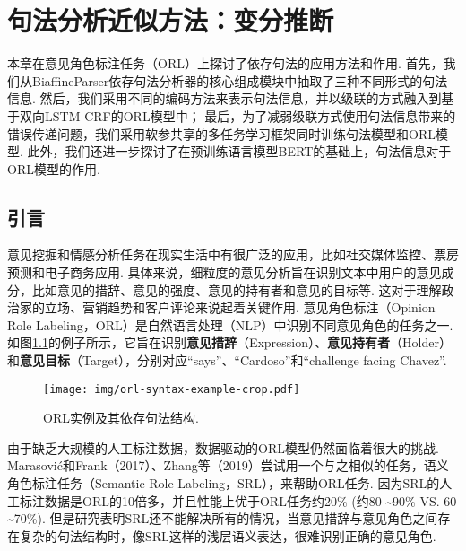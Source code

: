 \chapter{句法分析近似方法：变分推断}\label{cha:approximate-vi}
本章在意见角色标注任务（ORL）上探讨了依存句法的应用方法和作用.
首先，我们从BiaffineParser依存句法分析器的核心组成模块中抽取了三种不同形式的句法信息.
然后，我们采用不同的编码方法来表示句法信息，并以级联的方式融入到基于双向LSTM-CRF的ORL模型中；
最后，为了减弱级联方式使用句法信息带来的错误传递问题，我们采用软参共享的多任务学习框架同时训练句法模型和ORL模型.
此外，我们还进一步探讨了在预训练语言模型BERT的基础上，句法信息对于ORL模型的作用.

\section{引言}
意见挖掘和情感分析任务在现实生活中有很广泛的应用，比如社交媒体监控、票房预测和电子商务应用. 具体来说，细粒度的意见分析旨在识别文本中用户的意见成分，比如意见的措辞、意见的强度、意见的持有者和意见的目标等. 这对于理解政治家的立场、营销趋势和客户评论来说起着关键作用. 意见角色标注（Opinion Role Labeling，ORL）是自然语言处理（NLP）中识别不同意见角色的任务之一. 如图\ref{fig:example-syntax}的例子所示，它旨在识别\textbf{意见措辞}（Expression）、\textbf{意见持有者}（Holder）和\textbf{意见目标}（Target），分别对应“says”、“Cardoso”和“challenge facing Chavez”.

\begin{figure}[hb]
    \centering
    \texttt{[image: img/orl-syntax-example-crop.pdf]}
    \caption{ORL实例及其依存句法结构. }
    \label{fig:example-syntax}
\end{figure}

由于缺乏大规模的人工标注数据，数据驱动的ORL模型仍然面临着很大的挑战. Marasovi{\'c}和Frank（2017）、Zhang等（2019）尝试用一个与之相似的任务，语义角色标注任务（Semantic Role Labeling，SRL），来帮助ORL任务. 因为SRL的人工标注数据是ORL的10倍多，并且性能上优于ORL任务约20\% (约80 \textasciitilde 90\% VS. 60 \textasciitilde 70\%). 但是研究表明SRL还不能解决所有的情况，当意见措辞与意见角色之间存在复杂的句法结构时，像SRL这样的浅层语义表达，很难识别正确的意见角色.

